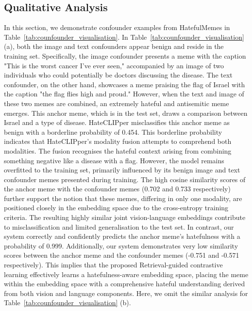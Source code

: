 \documentclass[11pt]{article}
\begin{document}
\subsection{Qualitative Analysis}
In this section, we demonstrate confounder examples from HatefulMemes in Table~\ref{tab:counfounder_visualisation}. 
In Table~\ref{tab:counfounder_visualisation} (a), both the image and text confounders appear benign and reside in the training set. Specifically, the image confounder presents a meme with the caption "This is the worst cancer I've ever seen," accompanied by an image of two individuals who could potentially be doctors discussing the disease. The text confounder, on the other hand, showcases a meme praising the flag of Israel with the caption "the flag flies high and proud." However, when the text and image of these two memes are combined, an extremely hateful and antisemitic meme emerges. This anchor meme, which is in the test set, draws a comparison between Israel and a type of disease.
HateCLIPper misclassifies this anchor meme as benign with a borderline probability of 0.454. This borderline probability indicates that HateCLIPper's modality fusion attempts to comprehend both modalities. The fusion recognises the hateful context arising from combining something negative like a disease with a flag. However, the model remains overfitted to the training set, primarily influenced by its benign image and text confounder memes presented during training. The high cosine similarity scores of the anchor meme with the confounder memes (0.702 and 0.733 respectively) further support the notion that these memes, differing in only one modality, are positioned closely in the embedding space due to the cross-entropy training criteria. The resulting highly similar joint vision-language embeddings contribute to misclassification and limited generalisation to the test set. In contrast, our system correctly and confidently predicts the anchor meme's hatefulness with a probability of 0.999. Additionally, our system demonstrates very low similarity scores between the anchor meme and the confounder memes (-0.751 and -0.571 respectively). This implies that the proposed Retrieval-guided contrastive learning effectively learns a hatefulness-aware embedding space, placing the meme within the embedding space with a comprehensive hateful understanding derived from both vision and language components. Here, we omit the similar analysis for Table~\ref{tab:counfounder_visualisation} (b).
\end{document}
